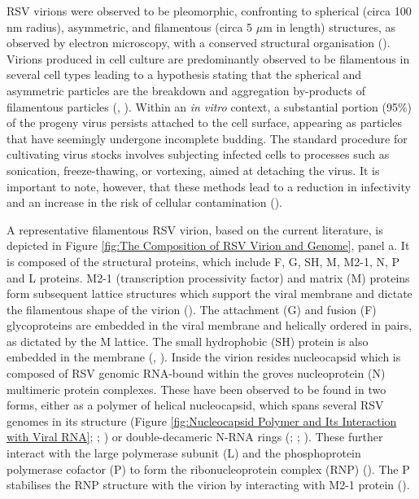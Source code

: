 RSV virions were observed to be pleomorphic, confronting to spherical (circa 100 nm radius), asymmetric, and filamentous (circa 5 \(\mu\)m in length) structures, as observed by electron microscopy, with a conserved structural organisation (\cite{Kiss2014StructuralComplex}). Virions produced in cell culture are predominantly observed to be filamentous in several cell types leading to a hypothesis stating that the spherical and asymmetric particles are the breakdown and aggregation by-products of filamentous particles (\cite{Ke2018TheTomography}, \cite{Conley2022HelicalVirus}). Within an \textit{in vitro} context, a substantial portion (95\%) of the progeny virus persists attached to the cell surface, appearing as particles that have seemingly undergone incomplete budding. The standard procedure for cultivating virus stocks involves subjecting infected cells to processes such as sonication, freeze-thawing, or vortexing, aimed at detaching the virus. It is important to note, however, that these methods lead to a reduction in infectivity and an increase in the risk of cellular contamination (\cite{Collins2013RespiratoryDisease}).

A representative filamentous RSV virion, based on the current literature, is depicted in Figure \ref{fig:The Composition of RSV Virion and Genome}, panel a. It is composed of the structural proteins, which include F, G, SH, M, M2-1, N, P and L proteins. M2-1 (transcription processivity factor) and matrix (M) proteins form subsequent lattice structures which support the viral membrane and dictate the filamentous shape of the virion (\cite{Conley2022HelicalVirus}). The attachment (G) and fusion (F) glycoproteins are embedded in the viral membrane and helically ordered in pairs, as dictated by the M lattice. The small hydrophobic (SH) protein is also embedded in the membrane (\cite{Ke2018TheTomography}, \cite{Conley2022HelicalVirus}). Inside the virion resides nucleocapsid which is composed of RSV genomic RNA-bound within the groves nucleoprotein (N) multimeric protein complexes. These have been observed to be found in two forms, either as a polymer of helical nucleocapsid, which spans several RSV genomes in its structure (Figure \ref{fig:Nucleocapsid Polymer and Its Interaction with Viral RNA}; \cite{Tawar2009CrystalVirus}; \cite{Conley2022HelicalVirus}) or double-decameric N-RNA rings (\cite{Gonnin2023StructuralNucleocapsids}; \cite{Gonnin2022ImportanceVirus}; \cite{Conley2022HelicalVirus}). These further interact with the large polymerase subunit (L) and the phosphoprotein polymerase cofactor (P) to form the ribonucleoprotein complex (RNP) (\cite{Gonnin2023StructuralNucleocapsids}). The P stabilises the RNP structure with the virion by interacting with M2-1 protein (\cite{Mason2003InteractionActivity.}).

